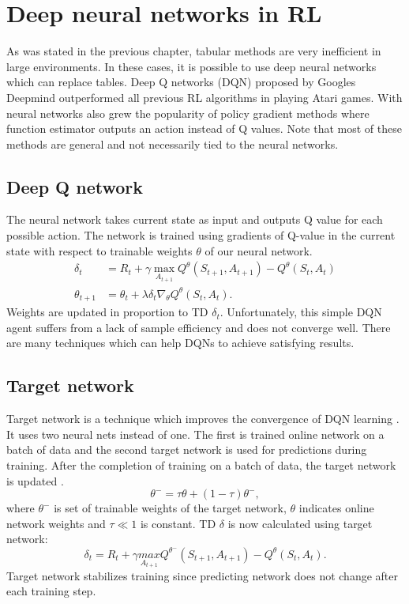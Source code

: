 \section{Deep neural networks in RL}
As was stated in the previous chapter, tabular methods are very inefficient in large environments. In these cases, it is possible to use deep neural networks which can replace tables. Deep Q networks (DQN) proposed by Googles Deepmind \cite{mnih2015} outperformed all previous RL algorithms in playing Atari games. With neural networks also grew the popularity of policy gradient methods where function estimator outputs an action instead of Q values. Note that most of these methods are general and not necessarily tied to the neural networks.

\subsection{Deep Q network}
The neural network takes current state as input and outputs Q value for each possible action. The network is trained using gradients of Q-value in the current state with respect to trainable weights $\theta$ of our neural network.
\begin{align} \label{eq:qlearn}
\delta_t &= R_{t} + \gamma \underset{A_{t+1}}{\max}Q^\theta(S_{t+1}, A_{t+1}) - Q^\theta(S_t, A_t)\\
\theta_{t+1} &= \theta_t + \lambda \delta_t \nabla_\theta Q^\theta (S_t, A_t).
\end{align}
Weights are updated in proportion to TD $\delta_t$. Unfortunately, this simple DQN agent suffers from a lack of sample efficiency and does not converge well. There are many techniques which can help DQNs to achieve satisfying results.

\subsection{Target network}
Target network is a technique which improves the convergence of DQN learning \cite{mnih2015}. It uses two neural nets instead of one. The first is trained online network on a batch of data and the second target network is used for predictions during training. After the completion of training on a batch of data, the target network is updated \cite{lilicrap2015}.
\begin{equation}
\theta^- = \tau \theta + (1-\tau)\theta^-,
\end{equation}
where $\theta^-$ is set of trainable weights of the target network, $\theta$ indicates online network weights and $\tau \ll 1$ is constant.
TD $\delta$ is now calculated using target network:
\begin{equation}
\delta_t = R_{t} + \gamma \underset{A_{t+1}}{max}Q^{\theta^-}(S_{t+1}, A_{t+1}) - Q^\theta(S_t, A_t). 
\end{equation}
Target network stabilizes training since predicting network does not change after each training step.

